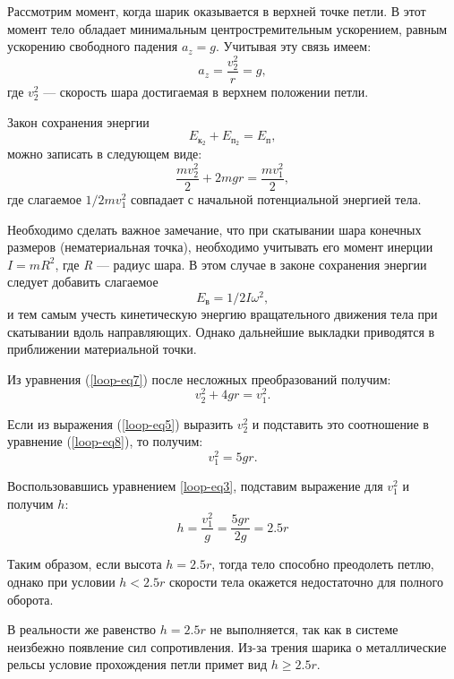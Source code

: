 \documentclass[14pt,a4paper,oneside]{extarticle}	%
\begin{document}
Рассмотрим момент, когда шарик оказывается в верхней точке петли.
В этот момент тело обладает минимальным центростремительным ускорением, равным ускорению свободного падения $ a_{z} = g $.
Учитывая эту связь имеем:  
\begin{equation}\label{loop-eq5}
a_{z} = \frac{v^{2}_{2}}{r} = g,
\end{equation}
где $ v^{2}_{2} $ — скорость шара достигаемая в верхнем положении петли.

Закон сохранения энергии
\begin{equation}\label{loop-eq6}
E_{\text{к}_{2}} + E_{\text{п}_{2}} = E_{\text{п}},
\end{equation}
можно записать в следующем виде:
\begin{equation}\label{loop-eq7}
\frac{mv_{2}^{2}}{2} + 2mgr = \frac{mv_{1}^{2}}{2},
\end{equation}
где слагаемое $1/2mv_{1}^{2} $ совпадает с начальной потенциальной энергией тела.

Необходимо сделать важное замечание, что при скатывании шара конечных размеров (нематериальная точка), необходимо учитывать его момент инерции $I = mR^2$, где \textit{R} — радиус шара.
В этом случае в законе сохранения энергии следует добавить слагаемое $$E_\text{в} = 1/2I\omega^{2},$$
и тем самым учесть кинетическую энергию вращательного движения тела при скатывании вдоль направляющих.
Однако дальнейшие выкладки приводятся в приближении материальной точки.

Из уравнения (\ref{loop-eq7}) после несложных преобразований получим:
\begin{equation}\label{loop-eq8}
v_{2}^{2} + 4gr = v_{1}^{2}.
\end{equation}

Если из выражения (\ref{loop-eq5}) выразить $ v_{2}^{2} $ и подставить это соотношение в уравнение (\ref{loop-eq8}), то получим:
\begin{equation}\label{10}
v_{1}^{2} = 5gr.
\end{equation}

Воспользовавшись уравнением \ref{loop-eq3}, подставим выражение для $ v_{1}^{2} $ и получим $ h $:
\begin{equation}\label{loop-eq9}
h = \frac{v_{1}^{2}}{g} = \frac{5gr}{2g} = 2.5r 
\end{equation}

Таким образом, если высота $ h = 2.5r $, тогда тело способно преодолеть петлю, однако при условии $ h < 2.5r $ скорости тела окажется недостаточно для полного оборота.

В реальности же равенство $ h = 2.5r $ не выполняется, так как в системе неизбежно появление сил сопротивления.
Из-за трения шарика о металлические рельсы условие прохождения петли примет вид $ h \geq 2.5r $.
\end{document}
